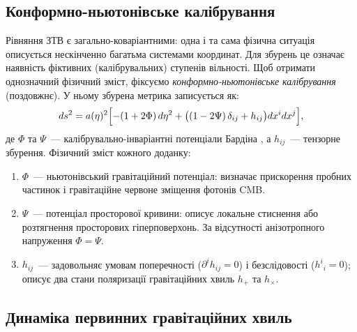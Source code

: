 \documentclass[12pt, a4paper]{article}
\begin{document}
\subsection{Конформно-ньютонівське калібрування}

Рівняння ЗТВ є загально-коваріантними: одна і та сама фізична
ситуація описується нескінченно багатьма системами координат.
Для збурень це означає наявність фіктивних (калібрувальних)
ступенів вільності. Щоб отримати однозначний фізичний зміст,
фіксуємо \emph{конформно-ньютонівське калібрування} (поздовжнє).
У ньому збурена метрика записується як:
\begin{equation}\label{eq:perturbed_metric}
  ds^2 = a(\eta)^2\Bigl[
    -(1 + 2\Phi)\,d\eta^2
    + \bigl((1 - 2\Psi)\,\delta_{ij} + h_{ij}\bigr)
      dx^i dx^j
  \Bigr],
\end{equation}
де $\Phi$ та $\Psi$~--- калібрувально-інваріантні потенціали
Бардіна \cite{bardeen_1980}, а $h_{ij}$~--- тензорне збурення.
Фізичний зміст кожного доданку:
\begin{enumerate}
  \item $\Phi$~--- ньютонівський гравітаційний потенціал:
        визначає прискорення пробних частинок і гравітаційне
        червоне зміщення фотонів CMB.
  \item $\Psi$~--- потенціал просторової кривини: описує
        локальне стиснення або розтягнення просторових
        гіперповерхонь. За відсутності анізотропного напруження
        $\Phi = \Psi$.
  \item $h_{ij}$~--- задовольняє умовам поперечності
        ($\partial^i h_{ij} = 0$) і безслідовості
        ($h^i{}_i = 0$); описує два стани поляризації
        гравітаційних хвиль $h_+$ та $h_\times$.
\end{enumerate}

\subsection{Динаміка первинних гравітаційних хвиль}
\end{document}
